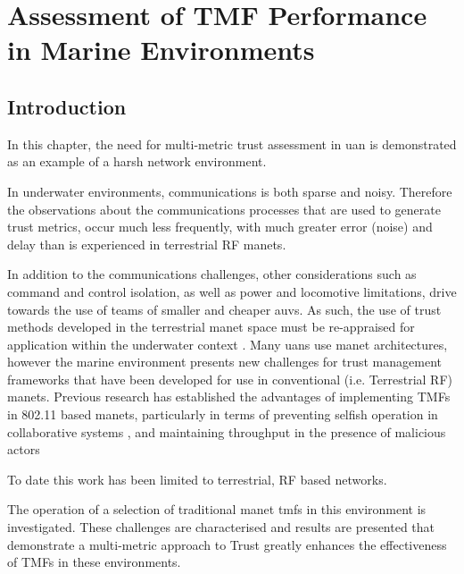 \def\ChapterTitle{Assessment of TMF Performance in Marine Environments}

\chapter{\ChapterTitle}
\label{Chapter\thechapter}


\section{Introduction}

In this chapter, the need for multi-metric trust assessment in \gls{uan} is demonstrated as an example of a harsh network environment.

In underwater environments, communications is both sparse and noisy.
Therefore the observations about the communications processes that are used to generate trust metrics, occur much less frequently, with much greater error (noise) and delay than is experienced in terrestrial RF \glspl{manet}.

In addition to the communications challenges, other considerations such as command and control isolation, as well as power and locomotive limitations, drive towards the use of teams of smaller and cheaper \glspl{auv}.
As such, the use of trust methods developed in the terrestrial \gls{manet} space must be re-appraised for application within the underwater context \cite{Pavan2015}.
Many \glspl{uan} use \gls{manet} architectures, however the marine environment presents new challenges for trust management frameworks that have been developed for use in conventional (i.e. Terrestrial RF) \glspl{manet}.
Previous research has established the advantages of implementing TMFs in 802.11 based \glspl{manet}, particularly in terms of preventing selfish operation in collaborative systems \cite{Li2007}, and maintaining throughput in the presence of malicious actors \cite{Buchegger2002}

To date this work has been limited to terrestrial, RF based networks. 

The operation of a selection of traditional \gls{manet} \glspl{tmf} in this environment is investigated.
These challenges are characterised and results are presented that demonstrate a multi-metric approach to Trust greatly enhances the effectiveness of TMFs in these environments.

